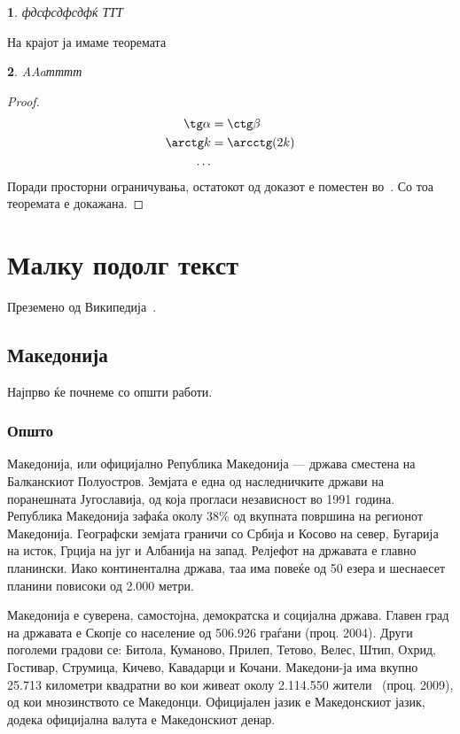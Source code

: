 \documentclass[a4paper]{report}
\newtheorem{theorem}{\cyr \CYRT\cyre\cyro\cyrr\cyre\cyrm\cyra}
\newtheorem{corollary}[theorem]{\cyr \CYRP\cyro\cyrs\cyrl\cyre\cyrd\cyri\cyrc\cyra}
\begin{document}
\begin{corollary}фдсфсдфсдфќ ТТТ
\end{corollary}

На крајот ја имаме теоремата~\cite{big}
\begin{theorem}AAaтттт
\end{theorem}
\begin{proof}
\begin{align*}
\tg \alpha &= \ctg \beta \\
\arctg k &= \arcctg (2k)\\
\ldots & 
\end{align*}
Поради просторни ограничувања, остатокот од доказот е поместен во~\cite{small}. Со тоа теоремата е докажана.
\end{proof}

 
 \chapter{Малку подолг текст}
 
 Преземено од Википедија~\cite{website:WikipediaMacedonia}.
 
 \section{Македонија}
 
 Најпрво ќе почнеме со општи работи.
 
 \subsection{Општо}
 
 Македонија, или официјално Република Македонија — држава сместена на Балканскиот Полуостров. Земјата е една од наследничките држави на поранешната Југославија, од која прогласи независност во 1991 година. Република Македонија зафаќа околу 38\% од вкупната површина на регионот Македонија. Географски земјата граничи со Србија и Косово на север, Бугарија на исток, Грција на југ и Албанија на запад. Релјефот на државата е главно планински. Иако континентална држава, таа има повеќе од 50 езера и шеснаесет планини повисоки од 2.000 метри.

Македонија е суверена, самостојна, демократска и социјална држава. Главен град на државата е Скопје со население од 506.926 граѓани (проц. 2004). Други поголеми градови се: Битола, Куманово, Прилеп, Тетово, Велес, Штип, Охрид, Гостивар, Струмица, Кичево, Кавадарци и Кочани. Македони-ја има вкупно 25.713 километри квадратни во кои живеат околу 2.114.550 жители~\cite{website:ExampleWeb} (проц. 2009), од кои мнозинството се Македонци. Официјален јазик е Македонскиот јазик, додека официјална валута е Македонскиот денар.
\end{document}
